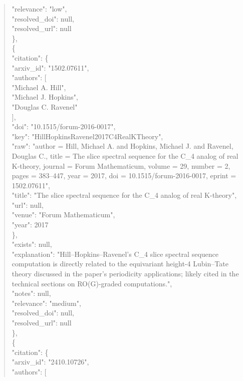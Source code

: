 \documentclass[11pt]{article}
\begin{document}
\begin{quote}
      "relevance": "low",\\
      "resolved\_doi": null,\\
      "resolved\_url": null\\
    \},\\
    \{\\
      "citation": \{\\
        "arxiv\_id": "1502.07611",\\
        "authors": [\\
          "Michael A. Hill",\\
          "Michael J. Hopkins",\\
          "Douglas C. Ravenel"\\
        ],\\
        "doi": "10.1515/forum-2016-0017",\\
        "key": "HillHopkinsRavenel2017C4RealKTheory",\\
        "raw": "author = Hill, Michael A. and Hopkins, Michael J. and Ravenel, Douglas C., title = The slice spectral sequence for the C\_4 analog of real K-theory, journal = Forum Mathematicum, volume = 29, number = 2, pages = 383--447, year = 2017, doi = 10.1515/forum-2016-0017, eprint = 1502.07611",\\
        "title": "The slice spectral sequence for the C\_4 analog of real K-theory",\\
        "url": null,\\
        "venue": "Forum Mathematicum",\\
        "year": 2017\\
      \},\\
      "exists": null,\\
      "explanation": "Hill--Hopkins--Ravenel's C\_4 slice spectral sequence computation is directly related to the equivariant height-4 Lubin--Tate theory discussed in the paper's periodicity applications; likely cited in the technical sections on RO(G)-graded computations.",\\
      "notes": null,\\
      "relevance": "medium",\\
      "resolved\_doi": null,\\
      "resolved\_url": null\\
    \},\\
    \{\\
      "citation": \{\\
        "arxiv\_id": "2410.10726",\\
        "authors": [\\

\end{quote}
\end{document}
